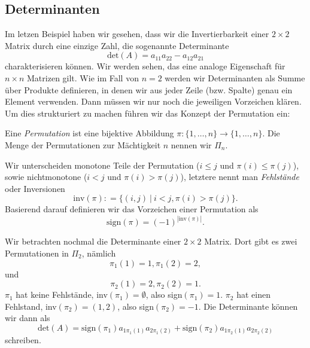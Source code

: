 \documentclass[letterpaper,10pt,english]{jupyterBook}
\begin{document}
\subsection{Determinanten}
\label{\detokenize{vektorraeume/LGS:determinanten}}
Im letzen Beispiel haben wir gesehen, dass wir die Invertierbarkeit einer \(2 \times 2\) Matrix durch eine einzige Zahl, die sogenannte Determinante
\begin{equation*}
 \text{det}(A) = a_{11} a_{22} - a_{12} a_{21}
\end{equation*}
charakterisieren können. Wir werden sehen, das eine analoge Eigenschaft für \(n \times n\) Matrizen gilt. Wie im Fall von \(n=2\) werden wir Determinanten als Summe über Produkte definieren, in denen wir aus jeder Zeile (bzw. Spalte) genau ein Element verwenden. Dann müssen wir nur noch die jeweiligen Vorzeichen klären. Um dies strukturiert zu machen führen wir das Konzept der Permutation ein:
\label{vektorraeume/LGS:definition-10}
\begin{definition}{}{}



Eine \emph{Permutation} ist eine bijektive Abbildung \(\pi: \{1,\ldots,n\} \rightarrow \{1,\ldots,n\} \). Die Menge der Permutationen zur Mächtigkeit \(n\) nennen wir \(\Pi_n\).
\end{definition}

Wir unterscheiden monotone Teile der Permutation (\(i \leq j\) und \(\pi(i) \leq \pi(j)\)), sowie nichtmonotone (\(i < j\) und \(\pi(i) > \pi(j)\)), letztere nennt man \emph{Fehlstände} oder Inversionen
\begin{equation*}
 \text{inv}(\pi): = \{(i,j)~|~i<j, \pi(i) > \pi(j) \}.
\end{equation*}
Basierend darauf definieren wir das Vorzeichen einer Permutation als
\begin{equation*}
 \text{sign}(\pi) =(-1)^{|\text{inv}(\pi)|}.
\end{equation*}\label{vektorraeume/LGS:example-11}
\begin{example}{}{}



Wir betrachten nochmal die Determinante einer \(2 \times 2\) Matrix. Dort gibt es zwei Permutationen in \(\Pi_2\), nämlich
\begin{equation*}
 \pi_1(1)=1, \pi_1(2)=2,
\end{equation*}
und
\begin{equation*}
 \pi_2(1)=2, \pi_2(2)=1.
\end{equation*}
\(\pi_1\) hat keine Fehlstände, inv\((\pi_1)=\emptyset\), also sign\((\pi_1)=1\). \(\pi_2\) hat einen Fehlstand, inv\((\pi_2)={(1,2)}\),
also  sign\((\pi_2)=-1\). Die Determinante können wir dann als
\begin{equation*}
 \text{det}(A) =  \text{sign}(\pi_1) a_{1\pi_1(1)} a_{2\pi_1(2)} + \text{sign}(\pi_2) a_{1\pi_2(1)} a_{2\pi_2(2)}\end{equation*}
schreiben.
\end{example}
\end{document}
